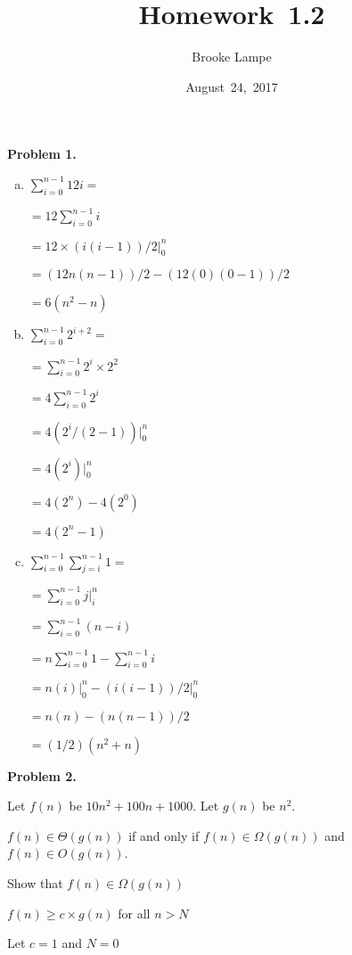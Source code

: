 \documentclass{article}
\begin{document}
\title{Homework~1.2}
\author{Brooke Lampe}
\date{August~24,~2017}

\textbf{Problem 1.}

	\begin{enumerate}[a.]
		\item $\sum_{i=0}^{n - 1} 12i = $
		
			$ = 12 \sum_{i=0}^{n - 1} i$
		
			$ = 12 \times (i(i - 1))/2 \rvert_{0}^{n}$
		
			$ = (12n(n - 1)) / 2 - (12(0)(0 - 1)) / 2$
		
			$ = 6(n^2 - n)$
		
		\item $\sum_{i=0}^{n - 1} 2^{i + 2} = $
		
			$ = \sum_{i=0}^{n - 1} 2^i \times 2^2$
		
			$ = 4 \sum_{i=0}^{n - 1} 2^i$
			
			$ = 4 (2^i / (2 - 1)) \rvert_{0}^{n}$
			
			$ = 4 (2^i) \rvert_{0}^{n}$
			
			$ = 4 (2^n) - 4 (2^0)$
			
			$ = 4 (2^n - 1)$
		
		\item $\sum_{i=0}^{n - 1} \sum_{j = i}^{n - 1} 1 = $
		
			$ = \sum_{i=0}^{n - 1} j \rvert_{i}^{n}$
		
			$ = \sum_{i=0}^{n - 1} (n - i)$
		
			$ = n \sum_{i=0}^{n - 1} 1 - \sum_{i=0}^{n - 1} i$
		
			$ = n(i) \rvert_{0}^{n} - (i(i - 1))/2 \rvert_{0}^{n}$
			
			$ = n(n) - (n(n - 1))/2$
			
			$ = (1/2)(n^2 + n)$
	\end{enumerate}

\newpage

\textbf{Problem 2.}

	Let $f(n)$ be $10n^2 + 100n + 1000$.  Let $g(n)$ be $n^2$.
	
	$f(n) \in \Theta(g(n))$ if and only if $f(n) \in \Omega(g(n))$ and $f(n) \in O(g(n))$.
	
	Show that $f(n) \in \Omega(g(n))$
	
	\hspace{4ex} $f(n) \geq c \times g(n)$ for all $n > N$
	
	\hspace{4ex} Let $c = 1$ and $N = 0$
	
\end{document}
